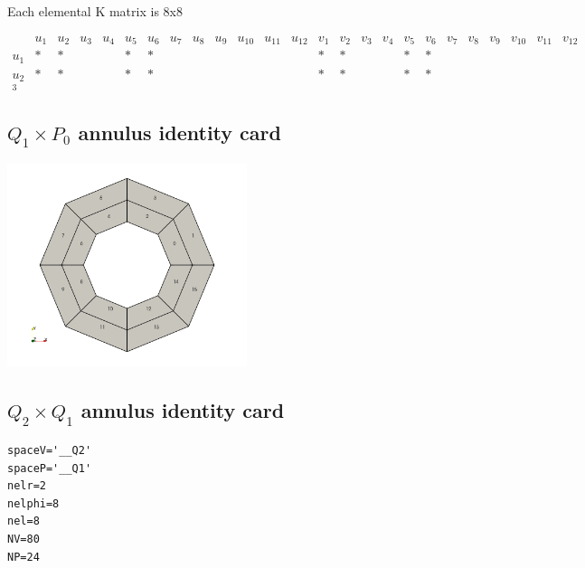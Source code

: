 Each elemental K matrix is 8x8

\begin{small}
\[
\begin{array}{cccccccccccccccccccccccccccc}
& u_1 & u_2 & u_3 & u_4 & u_5 & u_6 &
u_7 & u_8 & u_9 & u_{10} & u_{11} & u_{12} 
& v_1 & v_2 & v_3 & v_4 & v_5 & v_6 &
v_7 & v_8 & v_9 & v_{10} & v_{11} & v_{12} \\
u_1 & * & * & && * & * &&&&&&& * & * &&& * & *\\
u_2 & * & * & && * & * &&&&&&& * & * &&& * & *\\
_3
\end{array}
\]
\end{small}










\newpage
\subsection{$Q_1\times P_0$ annulus identity card}

\begin{center}
\includegraphics[width=7cm]{images/ELEFANT/annulus_Q1}
\end{center}




\newpage
\subsection{$Q_2\times Q_1$ annulus identity card}

\begin{small}
\begin{verbatim}
spaceV='__Q2'
spaceP='__Q1'
nelr=2
nelphi=8
nel=8
NV=80
NP=24
\end{verbatim}
\end{small}

